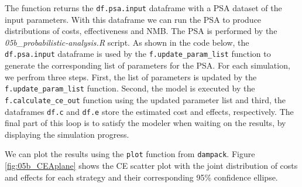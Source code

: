 \documentclass[]{article}
\newenvironment{Shaded}{\begin{snugshade}}{\end{snugshade}}
\newcommand{\KeywordTok}[1]{\textcolor[rgb]{0.13,0.29,0.53}{\textbf{#1}}}
\newcommand{\DataTypeTok}[1]{\textcolor[rgb]{0.13,0.29,0.53}{#1}}
\newcommand{\DecValTok}[1]{\textcolor[rgb]{0.00,0.00,0.81}{#1}}
\newcommand{\CharTok}[1]{\textcolor[rgb]{0.31,0.60,0.02}{#1}}
\newcommand{\StringTok}[1]{\textcolor[rgb]{0.31,0.60,0.02}{#1}}
\newcommand{\CommentTok}[1]{\textcolor[rgb]{0.56,0.35,0.01}{\textit{#1}}}
\newcommand{\ControlFlowTok}[1]{\textcolor[rgb]{0.13,0.29,0.53}{\textbf{#1}}}
\newcommand{\OperatorTok}[1]{\textcolor[rgb]{0.81,0.36,0.00}{\textbf{#1}}}
\newcommand{\NormalTok}[1]{#1}
\begin{document}
The function returns the \texttt{df.psa.input} dataframe with a PSA
dataset of the input parameters. With this dataframe we can run the PSA
to produce distributions of costs, effectiveness and NMB. The PSA is
performed by the \emph{05b\_probabilistic-analysis.R} script. As shown
in the code below, the \texttt{df.psa.input} dataframe is used by the
\texttt{f.update\_param\_list} function to generate the corresponding
list of parameters for the PSA. For each simulation, we perfrom three
steps. First, the list of parameters is updated by the
\texttt{f.update\_param\_list} function. Second, the model is executed
by the \texttt{f.calculate\_ce\_out} function using the updated
parameter list and third, the dataframes \texttt{df.c} and \texttt{df.e}
store the estimated cost and effects, respectively. The final part of
this loop is to satisfy the modeler when waiting on the results, by
displaying the simulation progress.

\begin{Shaded}
\end{Shaded}

We can plot the results using the \texttt{plot} function from
\texttt{dampack}. Figure \ref{fig:05b_CEAplane} shows the CE scatter
plot with the joint distribution of costs and effects for each strategy
and their corresponding 95\% confidence ellipse.
\end{document}
